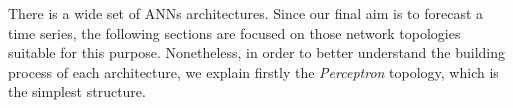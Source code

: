 \label{sec:topologies}

There is a wide set of ANNs architectures.
Since our final aim is to forecast a time series,
the following sections are focused on those network topologies suitable for this purpose. 
Nonetheless, in order to better understand the building process of each architecture, we explain firstly the \emph{Perceptron} topology, which is the simplest structure.
